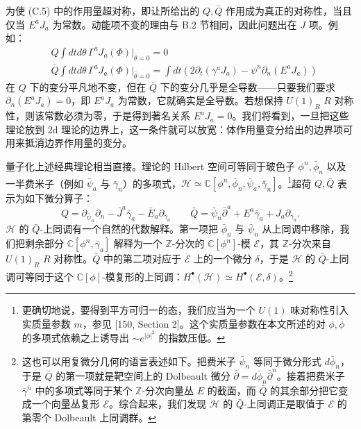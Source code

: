 为使 (C.5) 中的作用量超对称，即让所给出的 $Q,\bar Q$ 作用成为真正的对称性，当且仅当 $E^aJ_a$ 为常数。动能项不变的理由与 B.2 节相同，因此问题出在 $J$ 项。例如：
\begin{equation}\tag{C.6}
  \begin{aligned}
  &Q\int dtd\theta\,\Gamma^aJ_a(\Phi)\Big|_{\bar\theta=0}=0\\
  &\bar Q\int dtd\theta\,\Gamma^aJ_a(\Phi)\Big|_{\bar\theta=0}=\int dt\left(2\partial_t(\gamma^aJ_a)-\psi^n\partial_n(E^aJ_a)\right)
  \end{aligned}
\end{equation}
在 $Q$ 下的变分平凡地不变，但在 $\bar Q$ 下的变分几乎是全导数——只要我们要求 $\partial_n(E^aJ_a)=0$，即 $E^aJ_a$ 为常数，它就确实是全导数。若想保持 $U(1)_R$ $R$ 对称性，则该常数必须为零，于是得到著名关系 $E^aJ_a=0$。我们将看到，一旦把这些理论放到 2d 理论的边界上，这一条件就可以放宽：体作用量变分给出的边界项可用来抵消边界作用量的变分。

量子化上述经典理论相当直接。理论的 Hilbert 空间可等同于玻色子 $\phi^n,\bar\phi_n$ 以及一半费米子（例如 $\bar\psi_a$ 与 $\bar\gamma_n$）的多项式，$\mathcal{H}\simeq\mathbb{C}[\phi^n,\bar\phi_n,\bar\psi_a,\bar\gamma_n]$。\footnote{更确切地说，要得到平方可归一的态，我们应当为一个 $U(1)$ 味对称性引入实质量参数 $m$，参见 [150, Section 2]。这个实质量参数在本文所述的对 $\phi,\bar\phi$ 的多项式依赖之上诱导出 $\sim e^{|\phi|^2}$ 的指数压低。}超荷 $Q,\bar Q$ 表示为如下微分算子：
\begin{equation}\tag{C.7}
  Q=\partial_{\bar\psi_n}\partial_n-\bar J^a\bar\gamma_a-\bar E_a\partial_{\bar\gamma_a}\qquad \bar Q=\bar\psi_n\bar\partial^a+E^a\bar\gamma_a+J_a\partial_{\bar\gamma_a}.
\end{equation}
$\mathcal{H}$ 的 $\bar Q$-上同调有一个自然的代数解释。第一项把 $\bar\phi_n$ 与 $\bar\psi_n$ 从上同调中移除，我们把剩余部分 $\mathbb{C}[\phi^n,\bar\gamma_a]$ 解释为一个 $\mathbb{Z}$-分次的 $\mathbb{C}[\phi^n]$-模 $\mathcal{E}$，其 $\mathbb{Z}$-分次来自 $U(1)_R$ $R$ 对称性。$\bar Q$ 中的第二项对应于 $\mathcal{E}$ 上的一个微分 $\delta$，于是 $\mathcal{H}$ 的 $\bar Q$-上同调可等同于这个 $\mathbb{C}[\phi]$-模复形的上同调：$H^\bullet(\mathcal{H})\simeq H^\bullet(\mathcal{E},\delta)$。\footnote{这也可以用复微分几何的语言表述如下。把费米子 $\bar\psi_n$ 等同于微分形式 $d\bar\phi_n$，于是 $\bar Q$ 的第一项就是靶空间上的 Dolbeault 微分 $\bar\partial=d\bar\phi_n\bar\partial^n$。接着把费米子 $\bar\gamma^{\bar n}$ 中的多项式等同于某个 $\mathbb{Z}$-分次向量丛 $E$ 的截面，而 $\bar Q$ 的其余部分把它变成一个向量丛复形 $\mathcal{E}$。综合起来，我们发现 $\mathcal{H}$ 的 $\bar Q$-上同调正是取值于 $\mathcal{E}$ 的第零个 Dolbeault 上同调群。}

